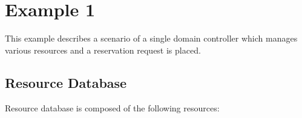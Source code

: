 \section{Example 1}

This example describes a scenario of a single domain controller which manages various resources and a reservation request is placed.


\subsection{Resource Database}

Resource database is composed of the following resources:
